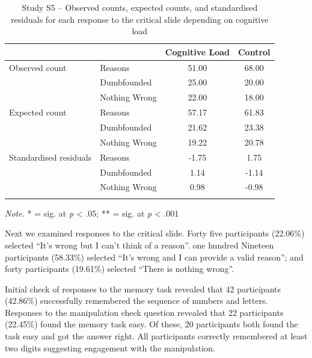 \documentclass[
  man,floatsintext]{apa6}
\begin{document}
\begin{table}[tbp]

\begin{center}
\begin{threeparttable}

\caption{\label{tab:S5tab1dumb}Study S5 – Observed counts, expected counts, and standardised residuals for each response to the critical slide depending on cognitive load}

\begin{tabular}{llcc}
\toprule
 & \multicolumn{1}{c}{} & \multicolumn{1}{c}{Cognitive Load} & \multicolumn{1}{c}{Control}\\
\midrule
Observed count & Reasons & 51.00 & 68.00\\
 & Dumbfounded & 25.00 & 20.00\\
 & Nothing Wrong & 22.00 & 18.00\\
Expected count & Reasons & 57.17 & 61.83\\
 & Dumbfounded & 21.62 & 23.38\\
 & Nothing Wrong & 19.22 & 20.78\\
Standardised residuals & Reasons & -1.75 & 1.75\\
 & Dumbfounded & 1.14 & -1.14\\
 & Nothing Wrong & 0.98 & -0.98\\
\bottomrule
\addlinespace
\end{tabular}

\begin{tablenotes}[para]
\normalsize{\textit{Note.} * = sig. at \emph{p} < .05; ** = sig. at \emph{p} < .001}
\end{tablenotes}

\end{threeparttable}
\end{center}

\end{table}

Next we examined responses to the critical slide. Forty five participants (22.06\%) selected ``It's wrong but I can't think of a reason''. one hundred Nineteen participants (58.33\%) selected ``It's wrong and I can provide a valid reason''; and forty participants (19.61\%) selected ``There is nothing wrong''.

Initial check of responses to the memory task revealed that 42 participants (42.86\%) successfully remembered the sequence of numbers and letters. Responses to the manipulation check question revealed that 22 participants (22.45\%) found the memory task easy. Of these, 20 participants both found the task easy and got the answer right. All participants correctly remembered at least two digits suggesting engagement with the manipulation.
\end{document}
